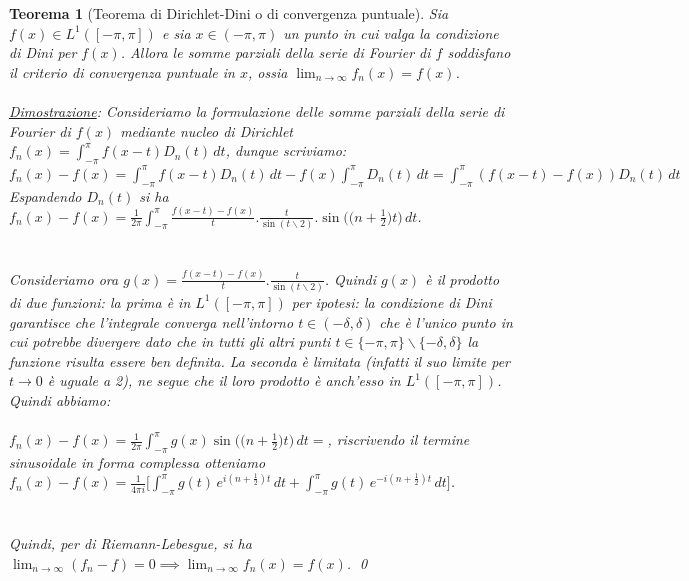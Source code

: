 \documentclass[a4paper,12pt]{report}
\newtheorem{teorema}{Teorema}[chapter]
\begin{document}
\begin{teorema}[Teorema di Dirichlet-Dini o di convergenza puntuale] 
Sia $f(x)\in L^1([-\pi,\pi])$ e sia $x\in (-\pi,\pi)$ un punto in cui valga la condizione di Dini per $f(x)$. Allora le somme parziali della serie di Fourier di $f$ soddisfano il criterio di convergenza puntuale in $x$, ossia $\displaystyle\lim_{n\to\infty} f_n(x)=f(x)$.
\\
\\ \underline{Dimostrazione}: Consideriamo la formulazione delle somme parziali della serie di Fourier di $f(x)$ mediante nucleo di Dirichlet $f_n(x)=\displaystyle\int_{-\pi}^\pi f(x-t)D_n(t)\,dt$, dunque scriviamo:
\\$f_n(x)-f(x)=\displaystyle\int_{-\pi}^\pi f(x-t)D_n(t)\,dt-f(x)\int_{-\pi}^\pi D_n(t)\,dt=\int_{-\pi}^\pi (f(x-t)-f(x))D_n(t)\,dt$
\\Espandendo $D_n(t)$ si ha $f_n(x)-f(x)=\displaystyle\frac{1}{2\pi}\int_{-\pi}^\pi \frac{f(x-t)-f(x)}{t}.\frac{t}{\sin(t\backslash 2)}.\sin\bigg(\bigg(n+\frac{1}{2}\bigg)t\bigg)\,dt$.
\\ 
\\
\\Consideriamo ora $g(x)=\displaystyle\frac{f(x-t)-f(x)}{t}.\frac{t}{\sin(t\backslash2)}$. Quindi $g(x)$ è il prodotto di due funzioni: la prima è in $L^1([-\pi,\pi])$ per ipotesi: la condizione di Dini garantisce che l'integrale converga nell'intorno $t\in (-\delta,\delta)$ che è l'unico punto in cui potrebbe divergere dato che in tutti gli altri punti $t\in \{-\pi,\pi\}\backslash\{-\delta,\delta\}$ la funzione risulta essere ben definita. La seconda è limitata (infatti il suo limite per $t\to0$ è uguale a 2), ne segue che il loro prodotto è anch'esso in $L^1([-\pi,\pi])$. Quindi abbiamo:
\\
\\$f_n(x)-f(x)=\displaystyle\frac{1}{2\pi}\int _{-\pi}^\pi g(x) \sin\bigg(\bigg(n+\frac{1}{2}\bigg)t\bigg)\,dt=$, riscrivendo il termine sinusoidale in forma complessa otteniamo $f_n(x)-f(x)=\frac{1}{4\pi i}\bigg[\int_{-\pi}^{\pi} g(t)\,e^{i\left(n+\frac12\right)t}\,dt +\int_{-\pi}^{\pi} g(t)\,e^{-i\left(n+\frac12\right)t}\,dt
\bigg]$.
\\ 
\\
\\Quindi, per di Riemann-Lebesgue, si ha $\displaystyle\lim_{n\to\infty}(f_n-f)=0\implies \lim_{n\to\infty}f_n(x)=f(x)$. \qed
    
\end{teorema}
\end{document}
